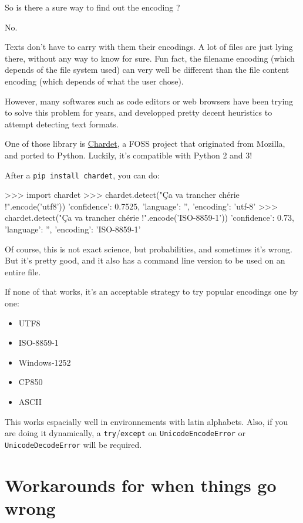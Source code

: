 So is there a sure way to find out the encoding ?

No.

Texts don't have to carry with them their encodings. A lot of files are just lying there, without any way to know for sure. Fun fact, the filename encoding (which depends of the file system used) can very well be different than the file content encoding (which depends of what the user chose).

However, many softwares such as code editors or web browsers have been trying to solve this problem for years, and developped pretty decent heuristics to attempt detecting text formats.

One of those library is \href{https://pypi.org/project/chardet/}{Chardet}, a FOSS project that originated from Mozilla, and ported to Python. Luckily, it's compatible with Python 2 and 3!

After a \lstinline{pip install chardet}, you can do:

\begin{py2and3}
>>> import chardet
>>> chardet.detect("Ça va trancher chérie !".encode('utf8'))
{'confidence': 0.7525, 'language': '', 'encoding': 'utf-8'}
>>> chardet.detect("Ça va trancher chérie !".encode('ISO-8859-1'))
{'confidence': 0.73, 'language': '', 'encoding': 'ISO-8859-1'}
\end{py2and3}

Of course, this is not exact science, but probabilities, and sometimes it's wrong. But it's pretty good, and it also has a command line version to be used on an entire file.

If none of that works, it's an acceptable strategy to try popular encodings one by one:

\begin{itemize}
\item UTF8
\item ISO-8859-1
\item Windows-1252
\item CP850
\item ASCII
\end{itemize}

This works espacially well in environnements with latin alphabets. Also, if you are doing it dynamically, a \lstinline{try}/\lstinline{except} on \lstinline{UnicodeEncodeError} or \lstinline{UnicodeDecodeError} will be required.

\section{Workarounds for when things go wrong}

